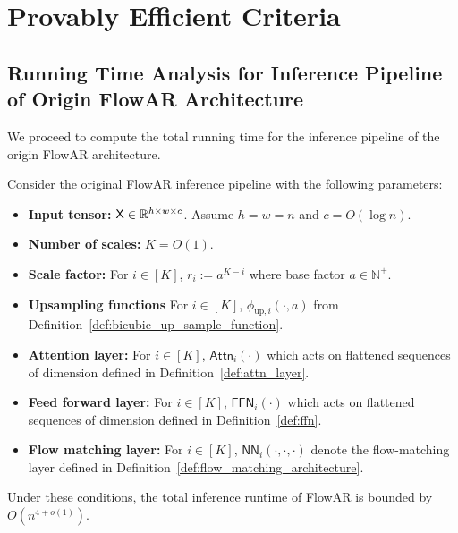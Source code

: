 \section{Provably Efficient Criteria}\label{sec:app_efficient_critieria}

\subsection{Running Time Analysis for Inference Pipeline of Origin FlowAR Architecture }\label{sec:runtime_origin_flowar}

We proceed to compute the total running time for the inference pipeline of the origin FlowAR architecture.
\begin{lemma}\label{lem:runtime_old_flowar_formal}
    Consider the original FlowAR inference pipeline with the following parameters:
    \begin{itemize}
        \item {\bf Input tensor:} $\mathsf{X} \in \mathbb{R}^{h \times w \times c}$. Assume $h=w=n$ and $c = O(\log n)$.
        \item {\bf Number of scales:} $K = O(1)$.
        \item {\bf Scale factor:} For $i \in [K]$, $r_i:= a^{K-i}$ where base factor $a \in \mathbb{N}^+$.
        \item {\bf Upsampling functions}  For $i \in [K]$, $\phi_{\mathrm{up},i}(\cdot,a)$ from Definition~\ref{def:bicubic_up_sample_function}.
        \item {\bf Attention layer:}  For $i \in [K]$, $\mathsf{Attn}_i(\cdot)$ which acts on flattened sequences of dimension defined in Definition~\ref{def:attn_layer}.
        \item {\bf Feed forward layer: } For $i \in [K]$, $\mathsf{FFN}_i(\cdot)$ which acts on flattened sequences of dimension defined in Definition~\ref{def:ffn}.
        \item {\bf Flow matching layer:} For $i \in [K]$, $\mathsf{NN}_i(\cdot,\cdot,\cdot)$ denote the flow-matching layer defined in Definition~\ref{def:flow_matching_architecture}.
    \end{itemize}
    Under these conditions, the total inference runtime of FlowAR is bounded by $O(n^{4+o(1)})$.
    
\end{lemma}

